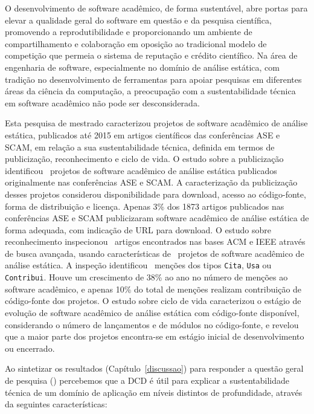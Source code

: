 \label{conclusoes}

O desenvolvimento de software acadêmico, de forma sustentável,
abre portas para elevar a qualidade geral do software em questão e
da pesquisa científica, promovendo a reprodutibilidade e
proporcionando um ambiente de compartilhamento e colaboração 
em oposição ao tradicional modelo de competição que permeia
o sistema de reputação e crédito científico.
%
Na área de engenharia de software, 
especialmente no domínio de análise estática,
com tradição no desenvolvimento de ferramentas para apoiar pesquisas
em diferentes áreas da ciência da computação,
a preocupação com a sustentabilidade técnica em software acadêmico
não pode ser desconsiderada. 

Esta pesquisa de mestrado caracterizou
projetos de software acadêmico de análise estática,
publicados até 2015 em artigos científicos das conferências ASE e SCAM,
em relação a sua sustentabilidade técnica, definida
em termos de publicização, reconhecimento e ciclo de vida.
%
O estudo sobre a publicização
identificou \SoftwareCount \ projetos de software acadêmico de análise estática
publicados originalmente nas conferências ASE e SCAM.
A caracterização da publicização desses projetos considerou
disponibilidade para download, acesso ao código-fonte, forma de distribuição e licença.
Apenas 3\% dos 1873 artigos publicados nas conferências ASE e SCAM 
publicizaram software acadêmico de análise estática de forma adequada,
com indicação de URL para download.
%
O estudo sobre reconhecimento 
inspecionou \SearchUniqueCount \ artigos encontrados nas bases ACM
e IEEE através de busca avançada, 
usando características de \SoftwareCount \ projetos 
de software acadêmico de análise estática. 
A inspeção identificou  \ScreeningCount \ menções 
dos tipos \texttt{Cita}, \texttt{Usa} ou \texttt{Contribui}.
Houve um crescimento de 38\% ao ano no número de menções ao software acadêmico, 
e apenas 10\% do total de menções realizam contribuição de código-fonte dos
projetos.
%
O estudo sobre ciclo de vida
caracterizou o estágio de evolução de software acadêmico de análise estática
com código-fonte disponível,
considerando o número de lançamentos e de módulos no código-fonte,
e revelou que a maior parte dos projetos encontra-se 
em estágio inicial de desenvolvimento ou encerrado.

Ao sintetizar os resultados (Capítulo~\ref{discussao}) para responder a questão
geral de pesquisa ({\it \QuestaoGeralUm}) percebemos que a DCD é útil para
explicar a sustentabilidade técnica de um domínio de aplicação em níveis
distintos de profundidade, através da seguintes características:

